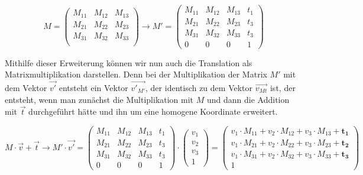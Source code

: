 \[
    M
    =
    \begin{pmatrix}
        M_{11} & M_{12} & M_{13} \\
        M_{21} & M_{22} & M_{23} \\
        M_{31} & M_{32} & M_{33} \\
    \end{pmatrix}
    \rightarrow
    M'
    =
    \begin{pmatrix}
        M_{11} & M_{12} & M_{13} & t_{1} \\
        M_{21} & M_{22} & M_{23} & t_{3} \\
        M_{31} & M_{32} & M_{33} & t_{3} \\
        0      & 0      & 0      & 1
    \end{pmatrix}
\]

Mithilfe dieser Erweiterung können wir nun auch die Translation als Matrixmultiplikation darstellen. Denn bei der Multiplikation der Matrix $M'$ mit dem Vektor $\vec{v'}$ entsteht ein Vektor $\vec{v'_{M'}}$, der identisch zu dem Vektor $\vec{v_{Mt}}$ ist, der entsteht, wenn man zunächst die Multiplikation mit $M$ und dann die Addition mit $\vec{t}$ durchgeführt hätte und ihn um eine homogene Koordinate erweitert.

\begin{equation}
    M
    \cdot
    \vec{v}
    +
    \vec{t}
    \rightarrow
    M'
    \cdot
    \vec{v'}
    =
    \begin{pmatrix}
        M_{11} & M_{12} & M_{13} & t_{1} \\
        M_{21} & M_{22} & M_{23} & t_{3} \\
        M_{31} & M_{32} & M_{33} & t_{3} \\
        0      & 0      & 0      & 1
    \end{pmatrix}
    \cdot
    \begin{pmatrix}
        v_{1} \\
        v_{2} \\
        v_{3} \\
        1
    \end{pmatrix}
    =
    \begin{pmatrix}
        v_{1} \cdot M_{11} + v_{2} \cdot M_{12} + v_{3} \cdot M_{13} + \boldsymbol{t_{1}} \\
        v_{1} \cdot M_{21} + v_{2} \cdot M_{22} + v_{3} \cdot M_{23} + \boldsymbol{t_{2}} \\
        v_{1} \cdot M_{31} + v_{2} \cdot M_{32} + v_{3} \cdot M_{33} + \boldsymbol{t_{3}} \\
        1
    \end{pmatrix}
\end{equation}
